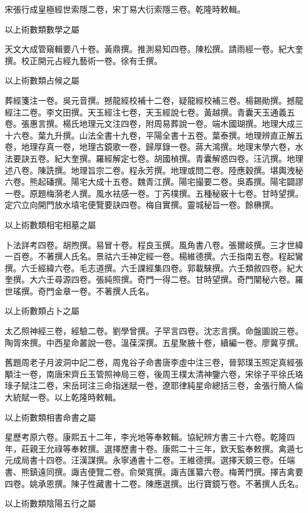 \begin{pinyinscope}
宋張行成皇極經世索隱二卷，宋丁易大衍索隱三卷。乾隆時敕輯。

以上術數類數學之屬

天文大成管窺輯要八十卷。黃鼎撰。推測易知四卷。陳松撰。請雨經一卷。紀大奎撰。校正開元占經九藝術一卷。徐有壬撰。

以上術數類占候之屬

葬經箋注一卷。吳元音撰。撼龍經校補十二卷，疑龍經校補三卷。楊錫勛撰。撼龍經注二卷。李文田撰。天玉經注七卷，天玉經說七卷。黃越撰。青囊天玉通義五卷。張惠言撰。楊氏地理元文注四卷，附周易葬說一卷。端木國瑚撰。地理大成三十六卷。葉九升撰。山法全書十九卷，平陽全書十五卷。葉泰撰。地理辨直正解五卷，地理存真一卷，地理古鏡歌一卷，歸厚錄一卷。蔣大鴻撰。地理末學六卷，水法要訣五卷。紀大奎撰。羅經解定七卷。胡國楨撰。青囊解惑四卷。汪沆撰。地理述八卷。陳詵撰。地理旨宗二卷。程永芳撰。地理或問二卷。陸應穀撰。堪輿洩秘六卷。熊起磻撰。陽宅大成十五卷。魏青江撰。陽宅撮要二卷。吳鼒撰。陽宅闢謬一卷。原題梅漪老人撰。風水袪感一卷。丁芮樸撰。五種秘竅十七卷。甘時望撰。定穴立向開門放水墳宅便覽要訣四卷。梅自實撰。靈城秘旨一卷。餘楙撰。

以上術數類相宅相墓之屬

卜法詳考四卷。胡煦撰。易冒十卷。程良玉撰。風角書八卷。張爾岐撰。三才世緯一百卷。不著撰人氏名。景祜六壬神定經一卷。楊維德撰。六壬指南五卷。程起鸞撰。六壬經緯六卷。毛志道撰。六壬課經集四卷。郭載騋撰。六壬類敘四卷。紀大奎撰。大六壬尋源四卷。張純照撰。奇門一得二卷。甘時望撰。奇門闡秘六卷。羅世瑤撰。奇門金章一卷。不著撰人氏名。

以上術數類占卜之屬

太乙照神經三卷，經驗二卷。劉學曾撰。子罕言四卷。沈志言撰。命盤圖說三卷。陶胥來撰。中西星命叢說一卷。溫葆深撰。五星聚腋十卷，續編一卷。廖冀亨撰。

舊題周老子月波洞中記二卷，周鬼谷子命書唐李虛中注三卷，晉郭璞玉照定真經張顒注一卷，南唐宋齊丘玉管照神局三卷，後周王樸太清神鑒六卷，宋徐子平徐氏珞琭子賦注二卷，宋岳珂注三命指迷賦一卷，遼耶律純星命總括三卷，金張行簡人倫大統賦一卷。以上乾隆時敕輯。

以上術數類相書命書之屬

星歷考原六卷。康熙五十二年，李光地等奉敕輯。協紀辨方書三十六卷。乾隆四年，莊親王允祿等奉敕撰。選擇歷書十卷。康熙二十三年，欽天監奉敕撰。禽遁七元成局書十四卷。汪漢謀撰。永寧通書十二卷。王維德撰。選擇天鏡三卷。任端書、熊鎮遠同撰。諏吉便覽二卷。俞榮寬撰。諏吉匯纂六卷。梅菁門撰。擇吉禽要四卷。姚承恩撰。陳子性藏書十二卷。陳應選撰。出行寶鏡丂卷。不著撰人氏名。

以上術數類陰陽五行之屬


\end{pinyinscope}
